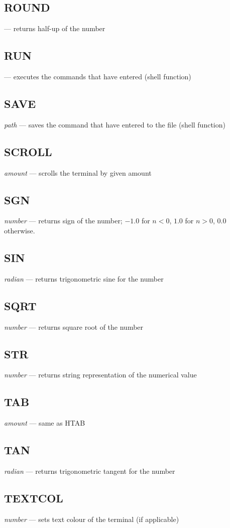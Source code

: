 \subsection{ROUND} --- returns half-up of the number
\subsection{RUN} --- executes the commands that have entered (shell function)
\subsection{SAVE} \emph{path} --- saves the command that have entered to the file (shell function)
\subsection{SCROLL} \emph{amount} --- scrolls the terminal by given amount
\subsection{SGN} \emph{number} --- returns sign of the number; $ -1.0 $ for $ n < 0 $, $ 1.0 $ for $ n > 0 $, $ 0.0 $ otherwise.
\subsection{SIN} \emph{radian} --- returns trigonometric sine for the number
\subsection{SQRT} \emph{number} --- returns square root of the number
\subsection{STR} \emph{number} --- returns string representation of the numerical value
\subsection{TAB} \emph{amount} --- same as HTAB
\subsection{TAN} \emph{radian} --- returns trigonometric tangent for the number
\subsection{TEXTCOL} \emph{number} --- sets text colour of the terminal (if applicable)
